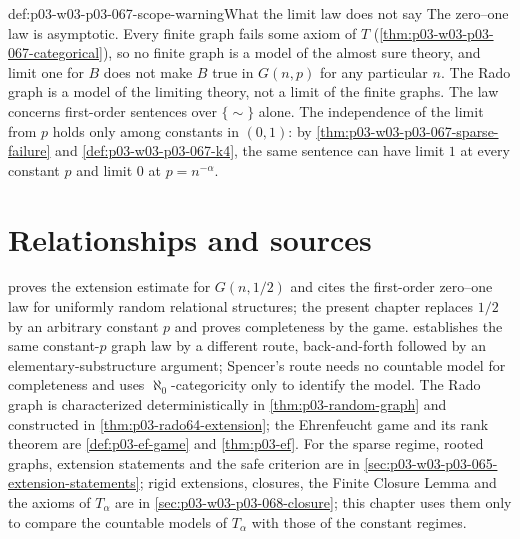 \begin{hbwarning}{def:p03-w03-p03-067-scope-warning}{What the limit law does not say}
The zero--one law is asymptotic.  Every finite graph fails some axiom of
\(T\) (\cref{thm:p03-w03-p03-067-categorical}), so no finite graph is a model
of the almost sure theory, and limit one for \(B\) does not make \(B\) true in
\(G(n,p)\) for any particular \(n\).  The Rado graph is a model of the limiting
theory, not a limit of the finite graphs.  The law concerns first-order
sentences over \(\{\sim\}\) alone.  The independence of the limit from \(p\)
holds only among constants in \((0,1)\): by
\cref{thm:p03-w03-p03-067-sparse-failure} and
\cref{def:p03-w03-p03-067-k4}, the same sentence can have limit \(1\) at
every constant \(p\) and limit \(0\) at \(p=n^{-\alpha}\).
\end{hbwarning}

\section{Relationships and sources}
\label{sec:p03-w03-p03-067-relationships}

 proves the extension estimate for \(G(n,1/2)\)
and cites the first-order zero--one law for uniformly random relational
structures; the present chapter replaces \(1/2\) by an arbitrary constant
\(p\) and proves completeness by the game.  
establishes the same constant-\(p\) graph law by a different route,
back-and-forth followed by an elementary-substructure argument; Spencer's
route needs no countable model for completeness and uses
\(\aleph_0\)-categoricity only to identify the model.  The Rado graph is
characterized deterministically in \cref{thm:p03-random-graph} and
constructed in \cref{thm:p03-rado64-extension}; the Ehrenfeucht game and its
rank theorem are \cref{def:p03-ef-game} and \cref{thm:p03-ef}.  For the
sparse regime, rooted graphs, extension statements and the safe criterion
are in \cref{sec:p03-w03-p03-065-extension-statements}; rigid extensions,
closures, the Finite Closure Lemma and the axioms of \(T_\alpha\) are in
\cref{sec:p03-w03-p03-068-closure}; this chapter uses them only to compare
the countable models of \(T_\alpha\) with those of the constant regimes.

